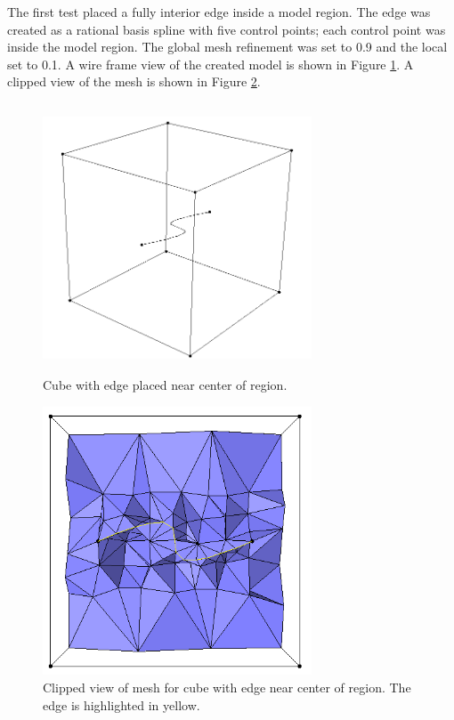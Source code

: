 \documentclass[a4paper, 12pt]{article}
\begin{document}
The first test placed a fully interior edge inside a model region. 
The edge was created as a rational basis spline with five control points; 
each control point was inside the model region.
The global mesh refinement was set to 0.9 and the local set to 0.1. 
A wire frame view of the created model is
shown in Figure \ref{fig:edge1model}.
A clipped view of the mesh is shown in Figure \ref{fig:edge1mesh}.

\begin{figure}[H]
  \centering
  \includegraphics[width=8cm, height=8cm]{test6_smd}
  \caption{Cube with edge placed near center of region.}
  \label{fig:edge1model}
\end{figure}

\begin{figure}[H]
  \centering
  \includegraphics[width=8cm, height=8cm]{test6_sms_clipped}
  \caption{Clipped view of mesh for cube with edge near center of region. 
          The edge is highlighted in yellow.}
  \label{fig:edge1mesh}
\end{figure}
\end{document}
